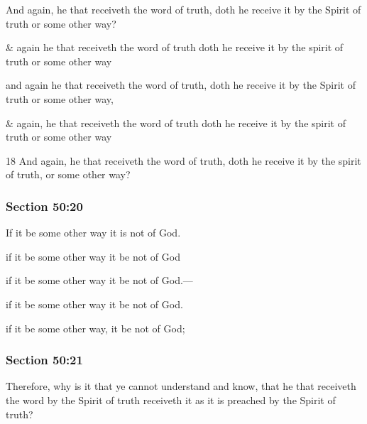 		And again, he that receiveth the word of truth, doth he receive it by the Spirit of truth or some other way?

		\begin{framed}
		\scriptsize
			\begin{compactdesc}
				\item[JSP] \& again he that receiveth the word of truth doth he receive it by the spirit of truth or some other way
				\item[Gilbert] and again he that receiveth the word of truth, doth he receive it by the Spirit of truth or some other way,
				\item[Hyde and Smith] \& again, he that receiveth the word of truth doth he receive it by the spirit of truth or some other way
				\item[BC] 18 And again, he that receiveth the word of truth, doth he receive it by the spirit of truth, or some other way?
			\end{compactdesc}
		\end{framed}

	\subsubsection{Section 50:20} %
		\label{DC50-20}

		If it be some other way it is not of God.

		\begin{framed}
		\scriptsize
			\begin{compactdesc}
				\item[JSP] if it be some other way it be not of God
				\item[Gilbert] if it be some other way it be not of God.---
				\item[Hyde and Smith] if it be some other way it be not of God.
				\item[BC] if it be some other way, it be not of God;
			\end{compactdesc}
		\end{framed}

	\subsubsection{Section 50:21} %
		\label{DC50-21}

		Therefore, why is it that ye cannot understand and know, that he that receiveth the word by the Spirit of truth receiveth it as it is preached by the Spirit of truth?

